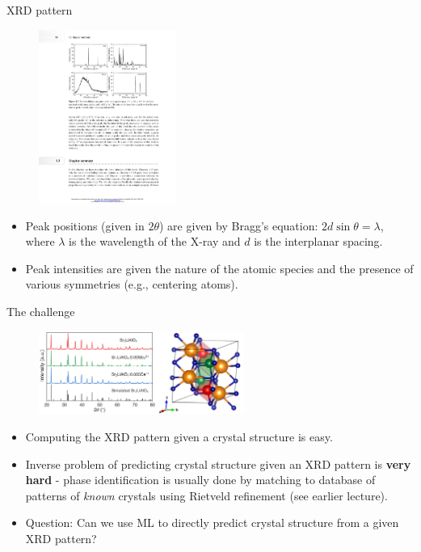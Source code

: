\documentclass[aspectratio=169]{beamer}
\begin{document}
\begin{frame}{XRD pattern}
\begin{figure}
    \centering
    \includegraphics[width=0.4\textwidth]{figures/xrd_patterns.pdf}
\end{figure}
\begin{itemize}
    \item Peak positions (given in $2\theta$) are given by Bragg's equation: $2d \sin{\theta} = \lambda$, where $\lambda$ is the wavelength of the X-ray and $d$ is the interplanar spacing.
    \item Peak intensities are given the nature of the atomic species and the presence of various symmetries (e.g., centering atoms).
\end{itemize}
\end{frame}


\begin{frame}{The challenge}
\begin{figure}
    \centering
    \includegraphics[width=0.6\textwidth]{figures/xrd_pattern.png}
\end{figure}
    \begin{itemize}
        \item Computing the XRD pattern given a crystal structure is easy.
        \item Inverse problem of predicting crystal structure given an XRD pattern is \textbf{very hard} - phase identification is usually done by matching to database of patterns of \textit{known} crystals using Rietveld refinement (see earlier lecture).
        \item Question: Can we use ML to directly predict crystal structure from a given XRD pattern?
    \end{itemize}
\end{frame}
\end{document}
